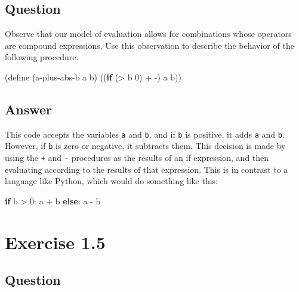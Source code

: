 \documentclass[
]{article}
\newenvironment{Shaded}{}{}
\newcommand{\ControlFlowTok}[1]{\textcolor[rgb]{0.00,0.44,0.13}{\textbf{#1}}}
\newcommand{\DecValTok}[1]{\textcolor[rgb]{0.25,0.63,0.44}{#1}}
\newcommand{\ExtensionTok}[1]{#1}
\newcommand{\FunctionTok}[1]{\textcolor[rgb]{0.02,0.16,0.49}{#1}}
\newcommand{\KeywordTok}[1]{\textcolor[rgb]{0.00,0.44,0.13}{\textbf{#1}}}
\newcommand{\NormalTok}[1]{#1}
\newcommand{\OperatorTok}[1]{\textcolor[rgb]{0.40,0.40,0.40}{#1}}
\begin{document}
\hypertarget{question-3}{%
\subsection{Question}\label{question-3}}

Observe that our model of evaluation allows for combinations whose
operators are compound expressions. Use this observation to describe the
behavior of the following procedure:

\hypertarget{a-plus-abs-b}{%
\label{a-plus-abs-b}}%
\begin{Shaded}
\begin{Highlighting}[numbers=left,,]
\NormalTok{(}\ExtensionTok{define}\FunctionTok{ }\NormalTok{(a{-}plus{-}abs{-}b a b)}
\NormalTok{  ((}\KeywordTok{if}\NormalTok{ (}\OperatorTok{\textgreater{}}\NormalTok{ b }\DecValTok{0}\NormalTok{) }\OperatorTok{+} \OperatorTok{{-}}\NormalTok{) a b))}
\end{Highlighting}
\end{Shaded}

\hypertarget{answer-3}{%
\subsection{Answer}\label{answer-3}}

This code accepts the variables \texttt{a} and \texttt{b}, and if
\texttt{b} is positive, it adds \texttt{a} and \texttt{b}. However, if
\texttt{b} is zero or negative, it subtracts them. This decision is made
by using the \texttt{+} and \texttt{-} procedures as the results of an
if expression, and then evaluating according to the results of that
expression. This is in contrast to a language like Python, which would
do something like this:

\begin{Shaded}
\begin{Highlighting}[]
\ControlFlowTok{if}\NormalTok{ b }\OperatorTok{\textgreater{}} \DecValTok{0}\NormalTok{: a }\OperatorTok{+}\NormalTok{ b}
\ControlFlowTok{else}\NormalTok{: a }\OperatorTok{{-}}\NormalTok{ b}
\end{Highlighting}
\end{Shaded}

\hypertarget{exercise-1.5}{%
\section{Exercise 1.5}\label{exercise-1.5}}

\hypertarget{question-4}{%
\subsection{Question}\label{question-4}}
\end{document}
